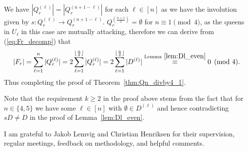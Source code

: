 \documentclass[pdflatex,sn-mathphys-num]{sn-jnl}
\theoremstyle{thmstyleone}
\theoremstyle{thmstyletwo}
\theoremstyle{thmstylethree}
\begin{document}
We have $|Q_r^{(\ell)}| = |Q_r^{(n+1-\ell)}|$ for each $\ell \in [n]$ as we have the involution given by 
$s : Q_r^{(\ell)} \to Q_r^{(n+1-\ell)}$. 
$Q_r^{(\frac{n+1}{2})} = \emptyset$ for $n \equiv 1 \pmod{4}$, as the queens in $U_\ell$ in this 
case are mutually attacking, therefore we can derive from (\ref{eq:Fr_decomp}) that
\begin{align} \label{eq:Fr_mod4_0}
    |F_r| = \sum_{\ell = 1}^{n} |Q_r^{(\ell)}| = 2\sum_{\ell=1}^{\lfloor \frac{n}{2} \rfloor} |Q_r^{(\ell)}|
    = 2\sum_{\ell=1}^{\lfloor \frac{n}{2} \rfloor} |D^{(\ell)}| \stackrel{\textrm{Lemma}~\ref{lem:Dl_even}}{\equiv} 0 \pmod{4}.
\end{align}
Thus completing the proof of Theorem~\ref{thm:Qn_divby4_1}.

Note that the requirement $k \geq 2$ in the proof above stems from the fact that for $n \in \lbrace 4,5 \rbrace$ we have
some $\ell \in [n]$ with $\emptyset \in D^{(\ell)}$ and hence contradicting $sD \neq D$ in the proof of Lemma~\ref{lem:Dl_even}.

\backmatter

I am grateful to Jakob Lemvig and Christian Henriksen for their supervision, regular meetings,
feedback on methodology, and helpful comments.


\end{document}

